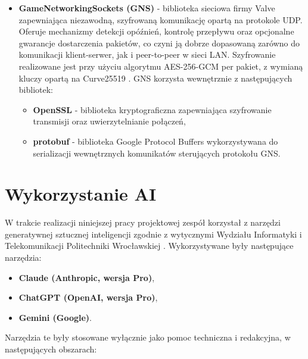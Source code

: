 \begin{enumerate}
\begin{itemize}
		\item \textbf{GameNetworkingSockets (GNS)} \cite{GNS} - biblioteka sieciowa
		firmy Valve zapewniająca niezawodną, szyfrowaną komunikację opartą na protokole
		UDP. Oferuje mechanizmy detekcji opóźnień, kontrolę przepływu oraz opcjonalne
		gwarancje dostarczenia pakietów, co czyni ją dobrze dopasowaną zarówno
		do komunikacji klient-serwer, jak i peer-to-peer w sieci LAN. Szyfrowanie
		realizowane jest przy użyciu algorytmu AES-256-GCM per pakiet,
		z wymianą kluczy opartą na Curve25519 \cite{GNS}. GNS korzysta wewnętrznie
		z następujących bibliotek:
		\begin{itemize}
			\item \textbf{OpenSSL} \cite{OpenSSL} - biblioteka kryptograficzna
			zapewniająca szyfrowanie transmisji oraz uwierzytelnianie połączeń,
			\item \textbf{protobuf} \cite{protobuf} - biblioteka Google Protocol Buffers
			wykorzystywana do serializacji wewnętrznych komunikatów sterujących
			protokołu GNS.
		\end{itemize}
	\end{itemize}
\end{enumerate}

\section{Wykorzystanie AI}

W trakcie realizacji niniejszej pracy projektowej zespół korzystał z narzędzi
generatywnej sztucznej inteligencji zgodnie z wytycznymi Wydziału Informatyki
i Telekomunikacji Politechniki Wrocławskiej \cite{WITWytyczneSI}.
Wykorzystywane były następujące narzędzia:

\begin{itemize}
	\item \textbf{Claude (Anthropic, wersja Pro)},
	\item \textbf{ChatGPT (OpenAI, wersja Pro)},
	\item \textbf{Gemini (Google)}.
\end{itemize}

Narzędzia te były stosowane wyłącznie jako pomoc techniczna i redakcyjna,
w następujących obszarach:

